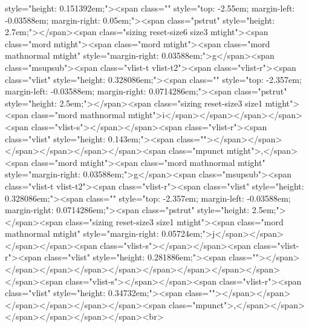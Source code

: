 style="height: 0.151392em;"><span class="" style="top: -2.55em; margin-left: -0.03588em; margin-right: 0.05em;"><span class="pstrut" style="height: 2.7em;"></span><span class="sizing reset-size6 size3 mtight"><span class="mord mtight"><span class="mord mtight"><span class="mord mathnormal mtight" style="margin-right: 0.03588em;">g</span><span class="msupsub"><span class="vlist-t vlist-t2"><span class="vlist-r"><span class="vlist" style="height: 0.328086em;"><span class="" style="top: -2.357em; margin-left: -0.03588em; margin-right: 0.0714286em;"><span class="pstrut" style="height: 2.5em;"></span><span class="sizing reset-size3 size1 mtight"><span class="mord mathnormal mtight">i</span></span></span></span><span class="vlist-s">​</span></span><span class="vlist-r"><span class="vlist" style="height: 0.143em;"><span class=""></span></span></span></span></span></span><span class="mpunct mtight">,</span><span class="mord mtight"><span class="mord mathnormal mtight" style="margin-right: 0.03588em;">g</span><span class="msupsub"><span class="vlist-t vlist-t2"><span class="vlist-r"><span class="vlist" style="height: 0.328086em;"><span class="" style="top: -2.357em; margin-left: -0.03588em; margin-right: 0.0714286em;"><span class="pstrut" style="height: 2.5em;"></span><span class="sizing reset-size3 size1 mtight"><span class="mord mathnormal mtight" style="margin-right: 0.05724em;">j</span></span></span></span><span class="vlist-s">​</span></span><span class="vlist-r"><span class="vlist" style="height: 0.281886em;"><span class=""></span></span></span></span></span></span></span></span></span></span><span class="vlist-s">​</span></span><span class="vlist-r"><span class="vlist" style="height: 0.34732em;"><span class=""></span></span></span></span></span></span><span class="mpunct">,</span></span></span></span></span></span><br>
